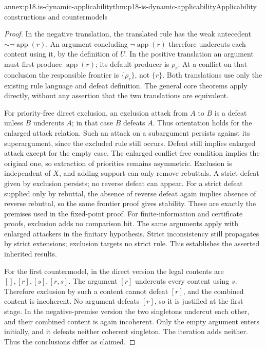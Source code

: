 \begin{annexitem}{annex:p18.is-dynamic-applicability}{thm:p18-is-dynamic-applicability}{Applicability constructions and countermodels}
\begin{proof}
In the negative translation, the translated rule has the weak
antecedent \(\mathord{\sim}\neg\operatorname{app}(r)\).
An argument concluding \(\neg\operatorname{app}(r)\) therefore
undercuts each content using it, by the definition of \(U\).
In the positive translation an argument must first produce
\(\operatorname{app}(r)\); its default producer is \(\rho_r\).
At a conflict on that conclusion the responsible frontier is
\(\{\rho_r\}\), not \(\{r\}\).
Both translations use only the existing rule language and
defeat definition. The general core theorems apply directly,
without any assertion that the two translations are equivalent.

For priority-free direct exclusion, an exclusion attack from
\(A\) to \(B\) is a defeat unless \(B\) undercuts \(A\);
in that case \(B\) defeats \(A\). Thus orientation holds for
the enlarged attack relation. Such an attack on a subargument
persists against its superargument, since the excluded rule
still occurs. Defeat still implies enlarged attack except for
the empty case.
The enlarged conflict-free condition implies the original one,
so extraction of priorities remains asymmetric.
Exclusion is independent of \(X\), and adding support can only
remove rebuttals. A strict defeat given by exclusion persists;
no reverse defeat can appear. For a strict defeat supplied only
by rebuttal, the absence of reverse defeat again implies absence
of reverse rebuttal, so the same frontier proof gives stability.
These are exactly the premises used in the fixed-point proof.
For finite-information and certificate proofs, exclusion adds
no comparison bit. The same arguments apply with enlarged
attackers in the finitary hypothesis. Strict inconsistency
still propagates by strict extensions; exclusion targets no
strict rule. This establishes the asserted inherited results.

For the first countermodel, in the direct version the legal
contents are \([], [r], [s], [r,s]\).
The argument \([r]\) undercuts every content using \(s\).
Therefore exclusion by such a content cannot defeat \([r]\),
and the combined content is incoherent. No argument defeats
\([r]\), so it is justified at the first stage.
In the negative-premise version the two singletons undercut
each other, and their combined content is again incoherent.
Only the empty argument enters initially, and it defeats
neither coherent singleton. The iteration adds neither.
Thus the conclusions differ as claimed.


\end{proof}
\end{annexitem}
